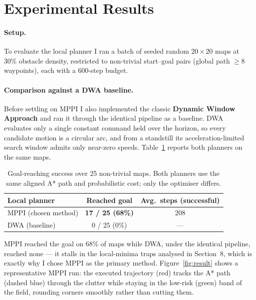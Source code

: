 \section{Experimental Results}

\paragraph{Setup.} To evaluate the local planner I ran a batch of seeded random $20\times20$
maps at 30\% obstacle density, restricted to non-trivial start--goal pairs (global path
$\ge 8$ waypoints), each with a 600-step budget.

\paragraph{Comparison against a DWA baseline.} Before settling on MPPI I also implemented the
classic \textbf{Dynamic Window Approach} and ran it through the
identical pipeline as a baseline. DWA evaluates only a single constant command held
over the horizon, so every candidate motion is a circular arc, and from a standstill its
acceleration-limited search window admits only near-zero speeds. Table~\ref{tab:bench} reports
both planners on the same maps.

\begin{table}[h]
    \centering
    \begin{tabular}{lcc}
        \toprule
        \textbf{Local planner} & \textbf{Reached goal} & \textbf{Avg.\ steps (successful)} \\
        \midrule
        MPPI (chosen method) & \textbf{17 / 25 (68\%)} & 208 \\
        DWA (baseline) & 0 / 25 (0\%) & --- \\
        \bottomrule
    \end{tabular}
    \caption{Goal-reaching success over 25 non-trivial maps. Both planners use the same
    aligned A* path and probabilistic cost; only the optimiser differs.}
    \label{tab:bench}
\end{table}

MPPI reached the goal on 68\% of maps while DWA, under the identical pipeline, reached none
--- it stalls in the local-minima traps analysed in Section~8, which is exactly why I chose
MPPI as the primary method. Figure~\ref{fig:result} shows a representative MPPI run: the
executed trajectory (red) tracks the A* path (dashed blue) through the clutter while staying
in the low-risk (green) band of the field, rounding corners smoothly rather than cutting them.

